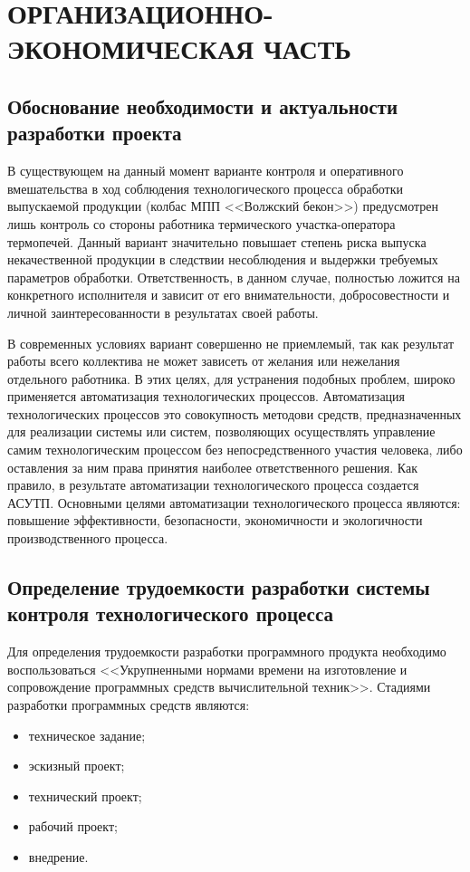 \section{ОРГАНИЗАЦИОННО-ЭКОНОМИЧЕСКАЯ ЧАСТЬ}

\subsection{Обоснование необходимости и актуальности разработки проекта}
\begin{par}
В существующем на данный момент варианте контроля и оперативного
вмешательства в ход соблюдения технологического процесса обработки выпускаемой продукции (колбас
МПП <<Волжский бекон>>) предусмотрен лишь контроль со стороны работника термического
участка-оператора термопечей. Данный вариант значительно повышает степень риска выпуска некачественной
продукции в следствии несоблюдения и выдержки требуемых параметров обработки. Ответственность, в
данном случае, полностью ложится на конкретного исполнителя и зависит от его внимательности,
добросовестности и личной заинтересованности в результатах своей работы.
\end{par}

\begin{par}
В современных условиях вариант совершенно не приемлемый, так как результат  работы всего
коллектива не может зависеть от желания или нежелания отдельного работника.
В этих целях, для устранения подобных проблем, широко применяется 
автоматизация технологических процессов. Автоматизация технологических процессов это
совокупность методови средств, предназначенных для реализации системы или систем, позволяющих
осуществлять управление самим технологическим процессом без непосредственного участия человека,
либо оставления за ним права принятия наиболее ответственного решения.
Как правило, в результате автоматизации технологического процесса создается АСУТП.
Основными целями автоматизации технологического процесса являются: повышение эффективности,
безопасности, экономичности и экологичности производственного процесса.
\end{par}

\subsection{Определение трудоемкости разработки системы контроля технологического процесса}
Для определения трудоемкости разработки программного продукта необходимо воспользоваться <<Укрупненными
нормами времени на изготовление и сопровождение программных средств вычислительной техник>>.
Стадиями разработки программных средств являются:
\begin{itemize}
    \item{} техническое задание;
    \item{} эскизный проект;
    \item{} технический проект;
    \item{} рабочий проект;
    \item{} внедрение.
\end{itemize}

